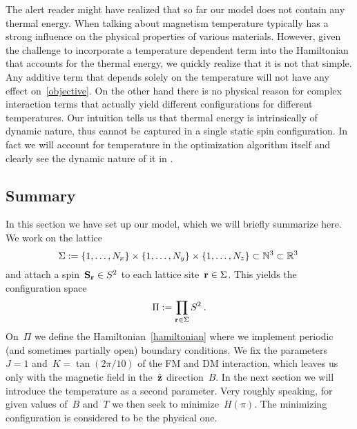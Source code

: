The alert reader might have realized that so far our model does not contain any
thermal energy. When talking about magnetism temperature typically has a strong
influence on the physical properties of various materials. However, given the
challenge to incorporate a temperature dependent term into the Hamiltonian that
accounts for the thermal energy, we quickly realize that it is not that simple.
Any additive term that depends solely on the temperature will not have any
effect on~\eqref{objective}. On the other hand there is no physical reason for
complex interaction terms that actually yield different configurations for
different temperatures. Our intuition tells us that thermal energy is
intrinsically of dynamic nature, thus cannot be captured in a single static spin
configuration. In fact we will account for temperature in the optimization
algorithm itself and clearly see the dynamic nature of it in .

\subsection{Summary}

In this section we have set up our model, which we will briefly summarize here.
We work on the lattice
%
\begin{equation}
  \Sigma := \{1,\dots,N_x\} \times \{1,\dots,N_y\} \times
  \{1,\dots,N_z\} \subset \mathbb{N}^3 \subset \mathbb{R}^3\:
\end{equation}
%
and attach a spin~$\mathbf{S}_{\mathbf{r}} \in S^2$ to each lattice site~$\mathbf{r} \in \Sigma$. This
yields the configuration space
%
\begin{equation}
  \Pi := \prod_{\mathbf{r} \in \Sigma} S^2\:.
\end{equation}
%
On~$\Pi$ we define the Hamiltonian~\eqref{hamiltonian} where we implement
periodic (and sometimes partially open) boundary conditions. We fix the
parameters~$J=1$ and~$K=\tan(2\pi / 10)$ of the FM and DM interaction, which
leaves us only with the magnetic field in the~$\hat{\mathbf{z}}$ direction~$B$. In the next
section we will introduce the temperature as a second parameter. Very
roughly speaking, for given values of~$B$ and~$T$ we then seek to
minimize~$H(\pi)$. The minimizing configuration is considered to be the physical
one.

